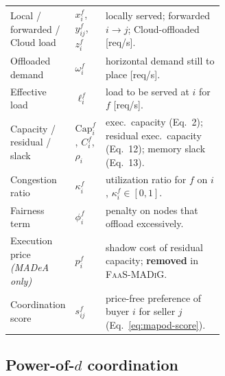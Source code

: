 \begin{table}[t]
\begin{tabular}{@{}l l p{0.62\linewidth}@{}}
Local / forwarded / Cloud load & $x_i^f$, $y_{ij}^f$, $z_i^f$ & locally served; forwarded $i\!\to\! j$; Cloud-offloaded [req/s].\\
Offloaded demand & $\omega_i^f$ & horizontal demand still to place [req/s].\\
Effective load & $\ell_i^f$ & load to be served at $i$ for $f$ [req/s].\\
Capacity / residual / slack & $\mathrm{Cap}_i^f$, $C_i^f$, $\rho_i$ & exec.\ capacity (Eq.~2); residual exec.\ capacity (Eq.~12); memory slack (Eq.~13).\\
Congestion ratio & $\kappa_i^f$ & utilization ratio for $f$ on $i$, $\kappa_i^f\in[0,1]$.\\
Fairness term & $\phi_i^f$ & penalty on nodes that offload excessively.\\
Execution price \emph{(MADeA only)} & $p_i^f$ & shadow cost of residual capacity; \textbf{removed} in \textsc{FaaS-MADiG}.\\
Coordination score & $s_{ij}^f$ & price-free preference of buyer $i$ for seller $j$ (Eq.~\eqref{eq:mapod-score}).\\
\bottomrule
\end{tabular}
\end{table}

\subsection{Power-of-$d$ coordination}
\label{sec:mapod-coordination}

